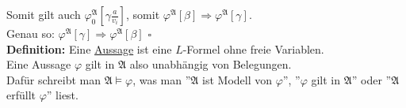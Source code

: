\documentclass[a4paper]{scrartcl}
\newcommand{\mfa}{\mathfrak{A}}  %
\begin{document}
Somit gilt auch $\varphi_0^\mfa[\gamma \frac{a}{v_i}]$, somit $\varphi^\mfa[\beta] \Rightarrow \varphi^\mfa[\gamma]$.\smallskip\\
Genau so: $\varphi^\mfa[\gamma] \Rightarrow \varphi^\mfa[\beta]$ \hfill $\square$\medskip\\
\textbf{Definition:}
Eine \underline{Aussage} ist eine $L$-Formel ohne freie Variablen.\medskip\\
Eine Aussage $\varphi$ gilt in $\mfa$ also unabhängig von Belegungen.\\
Dafür schreibt man $\mfa \vDash \varphi$, was man ''$\mfa$ ist Modell von $\varphi$'', ''$\varphi$ gilt in $\mfa$'' oder ''$\mfa$ erfüllt $\varphi$'' liest.
\end{document}
